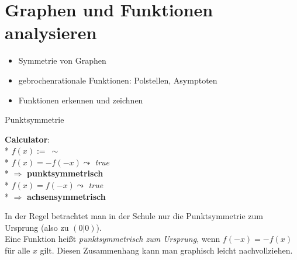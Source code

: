 \chapter{Graphen und Funktionen analysieren}
\begin{inhalt}
  \begin{itemize}
    \item Symmetrie von Graphen
    \item gebrochenrationale Funktionen: Polstellen, Asymptoten
    \item Funktionen erkennen und zeichnen
  \end{itemize}
\end{inhalt}

 \begin{bla}{Punktsymmetrie}
   \begin{marginfigure}
    \begin{tcolorbox}[colback=white!95!black,colframe=white!75!black,title=CAS:,arc=0mm]
      \begin{scriptsize}
        \textbf{Calculator}: \\*
        \hfill \( f(x) := \ \sim \) \\*
        \hfill \( f(x) = -f(-x) \leadsto \) \emph{true} \\* \hfill \( \Rightarrow \) \textbf{punktsymmetrisch} \\*
        \hfill \( f(x) = f(-x) \leadsto \) \emph{true} \\* \hfill \( \Rightarrow \) \textbf{achsensymmetrisch}
      \end{scriptsize}
    \end{tcolorbox}
  \end{marginfigure}
  In der Regel betrachtet man in der Schule nur die Punktsymmetrie zum Ursprung (also zu $(0|0)$). \\
  Eine Funktion heißt \emph{punktsymmetrisch zum Ursprung}, wenn $f(-x)=-f(x)$ für alle $x$ gilt. Diesen Zusammenhang kann man graphisch leicht nachvollziehen.
 \end{bla}

